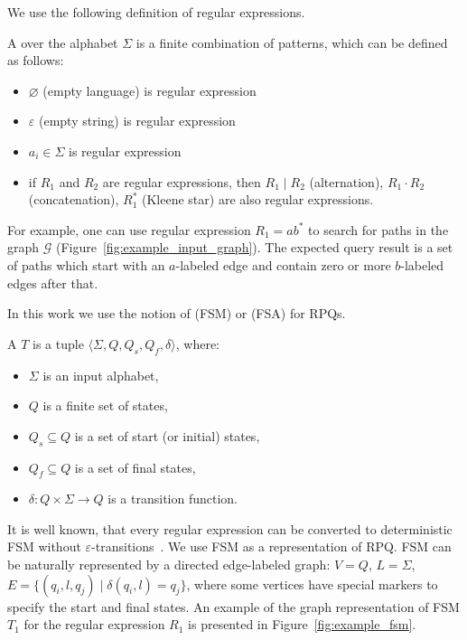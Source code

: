 We use the following definition of regular expressions.
\begin{definition}
A  over the alphabet $\Sigma$ is a finite combination of patterns, which can be defined as follows:
\begin{itemize}
    \item $\varnothing$ (empty language) is regular expression
    \item $\varepsilon$ (empty string) is regular expression
    \item $a_i \in \Sigma$ is regular expression
    \item if $R_1$ and $R_2$ are regular expressions, then $R_1 \mid R_2$ (alternation), $R_1 \cdot R_2$ (concatenation), $R_1^*$ (Kleene star) are also regular expressions. 
\end{itemize}
\end{definition} 

For example, one can use regular expression $R_1 = ab^*$ to search for paths in the graph $\mathcal{G}$ (Figure~\ref{fig:example_input_graph}).
The expected query result is a set of paths which start with an $a$-labeled edge and contain zero or more $b$-labeled edges after that.

In this work we use the notion of  (FSM) or  (FSA) for RPQs.

\begin{definition}
A  $T$ is a tuple $\langle \Sigma, Q, Q_s, Q_f, \delta \rangle$, where:
\begin{itemize}
    \item $\Sigma$ is an input alphabet,
    \item $Q$ is a finite set of states,
    \item $Q_s \subseteq Q$ is a set of start (or initial) states,
    \item $Q_f \subseteq Q$ is a set of final states,
    \item $\delta: Q \times \Sigma \to Q$ is a transition function.
\end{itemize}
\end{definition}

It is well known, that every regular expression can be converted to deterministic FSM without $\varepsilon$-transitions~\cite{automata:theory:10.5555/1177300}.
We use FSM as a representation of RPQ.
FSM can be naturally represented by a directed edge-labeled graph: $V = Q$, $L = \Sigma$, $E = \{(q_i,l,q_j) \mid \delta(q_i,l) = q_j\}$, where some vertices have special markers to specify the start and final states.
An example of the graph representation of FSM $T_1$ for the regular expression $R_1$ is presented in Figure~\ref{fig:example_fsm}.

